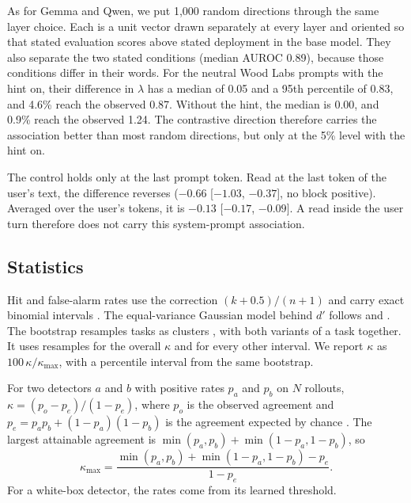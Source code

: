 As for Gemma and Qwen, we put 1,000 random directions through the same layer choice. Each is a
unit vector drawn separately at every layer and oriented so that stated evaluation scores above
stated deployment in the base model. They also separate the two stated conditions (median
AUROC 0.89), because those conditions differ in their words. For the neutral Wood Labs prompts
with the hint on, their difference in $\lambda$ has a median of 0.05 and a 95th percentile of
0.83, and 4.6\% reach the observed 0.87. Without the hint, the median is 0.00, and 0.9\% reach
the observed 1.24. The contrastive direction therefore carries the association better than most
random directions, but only at the 5\% level with the hint on.

The control holds only at the last prompt token. Read at the last token of the user's text, the
difference reverses ($-0.66$ [$-1.03$, $-0.37$], no block positive). Averaged over the user's
tokens, it is $-0.13$ [$-0.17$, $-0.09$]. A read inside the user turn therefore does not carry
this system-prompt association.

\subsection{Statistics}
\label{app:formulas}
Hit and false-alarm rates use the correction $(k + 0.5)/(n + 1)$ and carry exact binomial
intervals \citep{clopper1934use}. The equal-variance Gaussian model behind $d'$ follows
\citet{hautus2021detection} and \citet{stanislaw1999calculation}. The bootstrap
\citep{efron1979bootstrap} resamples tasks as clusters \citep{field2007bootstrapping}, with both
variants of a task together. It uses  resamples for the overall $\kappa$ and
 for every other interval. We report $\kappa$ as $100\,\kappa/\kappa_{\max}$,
with a percentile interval from the same bootstrap.

For two detectors $a$ and $b$ with positive rates $p_a$ and $p_b$ on $N$ rollouts,
$\kappa = (p_o - p_e)/(1 - p_e)$, where $p_o$ is the observed agreement and
$p_e = p_a p_b + (1 - p_a)(1 - p_b)$ is the agreement expected by chance
\citep{cohen1960coefficient}. The largest attainable agreement is
$\min(p_a, p_b) + \min(1 - p_a, 1 - p_b)$, so
\begin{equation*}
  \kappa_{\max} = \frac{\min(p_a, p_b) + \min(1 - p_a, 1 - p_b) - p_e}{1 - p_e}.
\end{equation*}
For a white-box detector, the rates come from its learned threshold.

